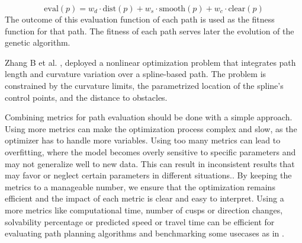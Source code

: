 \begin{equation}
    \text{eval}(p) = w_d \cdot \text{dist}(p) + w_s \cdot \text{smooth}(p) + w_c \cdot \text{clear}(p)
    \label{evaluation}
\end{equation}
The outcome of this evaluation function of each path is used as the fitness function for that path.
The fitness of each path serves later the evolution of the genetic algorithm.

Zhang B et al. \cite{R36}, deployed a nonlinear optimization problem that integrates path length and 
curvature variation over a spline-based path. The problem is constrained by the curvature limits, the 
parametrized location of the spline's control points, and the distance to obstacles.

Combining metrics for path evaluation should be done with a simple approach. Using more metrics can make 
the optimization process complex 
and slow, as the optimizer has to handle more variables. Using too many metrics can lead to overfitting, 
where the model becomes overly sensitive to specific parameters and may not generalize well to new data. 
This can result in inconsistent results that may favor or neglect certain parameters in different situations.. 
By keeping the metrics to a 
manageable number, we ensure that the optimization remains efficient and the impact of each metric 
is clear and easy to interpret. 
Using a more metrics like computational time, number of cusps or direction changes, solvability percentage
or predicted speed or travel time can be efficient for evaluating path planning algorithms and benchmarking some
usecases as in \cite{R23}.


